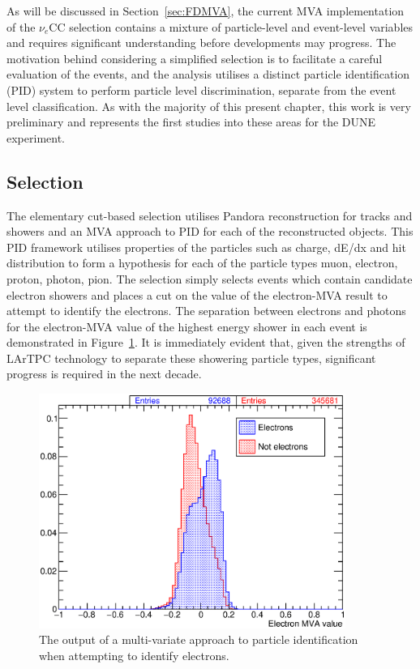 As will be discussed in Section~\ref{sec:FDMVA}, the current MVA implementation of the $\nu_e$CC selection contains a mixture of particle-level and event-level variables and requires significant understanding before developments may progress.  The motivation behind considering a simplified selection is to facilitate a careful evaluation of the events, and the analysis utilises a distinct particle identification (PID) system to perform particle level discrimination, separate from the event level classification.  As with the majority of this present chapter, this work is very preliminary and represents the first studies into these areas for the DUNE experiment.

\subsection{Selection}\label{sec:FDCutSelection}

The elementary cut-based selection utilises Pandora reconstruction for tracks and showers and an MVA approach to PID for each of the reconstructed objects.  This PID framework \cite{GrantPID2016} utilises properties of the particles such as charge, dE/dx and hit distribution to form a hypothesis for each of the particle types muon, electron, proton, photon, pion.  The selection simply selects events which contain candidate electron showers and places a cut on the value of the electron-MVA result to attempt to identify the electrons.  The separation between electrons and photons for the electron-MVA value of the highest energy shower in each event is demonstrated in Figure~\ref{fig:ElectronMVA}.  It is immediately evident that, given the strengths of LArTPC technology to separate these showering particle types, significant progress is required in the next decade.

\begin{figure}
  \centering
  \includegraphics[width=10cm]{ElectronMVA.eps}
  \caption[The output of a multi-variate approach to particle identification when attempting to identify electrons.]{The output of a multi-variate approach to particle identification when attempting to identify electrons.}
  \label{fig:ElectronMVA}
\end{figure}

